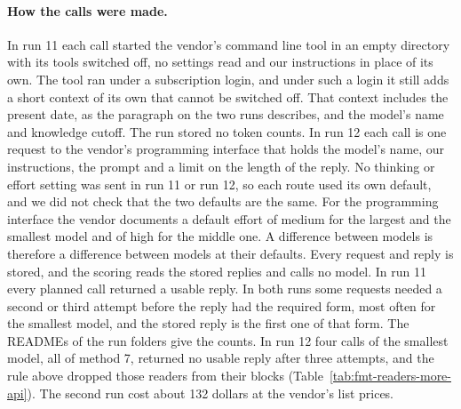\paragraph{How the calls were made.} In run 11 each call started the vendor's command line tool in an empty directory with its tools switched off, no settings read and our instructions in place of its own. The tool ran under a subscription login, and under such a login it still adds a short context of its own that cannot be switched off. That context includes the present date, as the paragraph on the two runs describes, and the model's name and knowledge cutoff. The run stored no token counts. In run 12 each call is one request to the vendor's programming interface that holds the model's name, our instructions, the prompt and a limit on the length of the reply. No thinking or effort setting was sent in run 11 or run 12, so each route used its own default, and we did not check that the two defaults are the same. For the programming interface the vendor documents a default effort of medium for the largest and the smallest model and of high for the middle one. A difference between models is therefore a difference between models at their defaults. Every request and reply is stored, and the scoring reads the stored replies and calls no model. In run 11 every planned call returned a usable reply. In both runs some requests needed a second or third attempt before the reply had the required form, most often for the smallest model, and the stored reply is the first one of that form. The READMEs of the run folders give the counts. In run 12 four calls of the smallest model, all of method 7, returned no usable reply after three attempts, and the rule above dropped those readers from their blocks (Table~\ref{tab:fmt-readers-more-api}). The second run cost about 132 dollars at the vendor's list prices.

